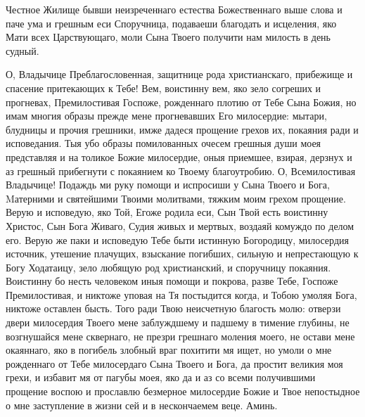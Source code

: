 Честное Жилище бывши неизреченнаго естества Божественнаго выше слова и паче ума и грешным еси Споручница, подаваеши благодать и исцеления, яко Мати всех Царствующаго, моли Сына Твоего получити нам милость в день судный.




О, Владычице Преблагословенная, защитнице рода христианскаго, прибежище и спасение притекающих к Тебе! Вем, воистинну вем, яко зело согреших и прогневах, Премилостивая Госпоже, рожденнаго плотию от Тебе Сына Божия, но имам многия образы прежде мене прогневавших Его милосердие: мытари, блудницы и прочия грешники, имже дадеся прощение грехов их, покаяния ради и исповедания. Тыя убо образы помилованных очесем грешныя души моея представляя и на толикое Божие милосердие, оныя приемшее, взирая, дерзнух и аз грешный прибегнути с покаянием ко Твоему благоутробию. О, Всемилостивая Владычице! Подаждь ми руку помощи и испросиши у Сына Твоего и Бога, Mатерними и святейшими Твоими молитвами, тяжким моим грехом прощение. Верую и исповедую, яко Той, Егоже родила еси, Сын Твой есть воистинну Христос, Сын Бога Живаго, Судия живых и мертвых, воздаяй комуждо по делом его. Верую же паки и исповедую Тебе быти истинную Богородицу, милосердия источник, утешение плачущих, взыскание погибших, сильную и непрестающую к Богу Ходатаицу, зело любящую род христианский, и споручницу покаяния. Воистинну бо несть человеком иныя помощи и покрова, разве Тебе, Госпоже Премилостивая, и никтоже уповая на Тя постыдится когда, и Тобою умоляя Бога, никтоже оставлен бысть. Того ради Твою неисчетную благость молю: отверзи двери милосердия Твоего мене заблуждшему и падшему в тимение глубины, не возгнушайся мене сквернаго, не презри грешнаго моления моего, не остави мене окаяннаго, яко в погибель злобный враг похитити мя ищет, но умоли о мне рожденнаго от Тебе милосердаго Сына Твоего и Бога, да простит великия моя грехи, и избавит мя от пагубы моея, яко да и аз со всеми получившими прощение воспою и прославлю безмерное милосердие Божие и Твое непостыдное о мне заступление в жизни сей и в нескончаемем веце. Аминь.
\mychapterending

 



